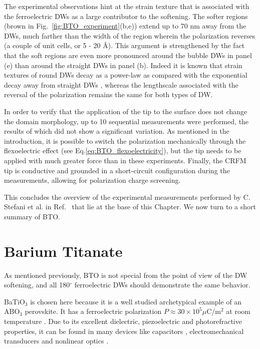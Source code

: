 The experimental observations hint at the strain texture that is associated with the ferroelectric DWs as a large contributor to the softening.
The softer regions (brown in Fig.~\ref{fig:BTO_experiment}(b,e)) extend up to 70 nm away from the DWs, much farther than the width of the region wherein the polarization reverses (a couple of unit cells, or 5 - 20 \AA \cite{Zhirnov1959}).
This argument is strengthened by the fact that the soft regions are even more pronounced around the bubble DWs in panel (e) than around the straight DWs in panel (b).
Indeed it is known that strain textures of round DWs decay as a power-law as compared with the exponential decay away from straight DWs \cite{Landau1960}, whereas the lengthscale associated with the reversal of the polarization remains the same for both types of DW.

In order to verify that the application of the tip to the surface does not change the domain morphology, up to 10 sequential measurements were performed, the results of which did not show a significant variation.
As mentioned in the introduction, it is possible to switch the polarization mechanically through the flexoelectric effect (see Eq.\ref{eq:BTO_flexoelectricity}), but the tip needs to be applied with much greater force than in these experiments.
Finally, the CRFM tip is conductive and grounded in a short-circuit configuration during the measurements, allowing for polarization charge screening.

This concludes the overview of the experimental measurements performed by C. Stefani et al. in Ref.~\cite{Stefani2020} that lie at the base of this Chapter.
We now turn to a short summary of BTO.

\section{Barium Titanate}
As mentioned previously, BTO is not special from the point of view of the DW softening, and all 180$^\circ$ ferroelectric DWs should demonstrate the same behavior.

BaTiO$_3$ is chosen here because it is a well studied archetypical example of an ABO$_3$ perovskite.
It has a ferroelectric polarization $P \approx 30 \times 10^5 \mu $C/m$^2$ at room temperature \cite{Mason1948, VonHippel1950, Ghosez1994}.
Due to its excellent dielectric, piezoelectric and photorefractive properties, it can be found in many devices like capacitors \cite{American1963}, electromechanical transducers \cite{Schofield1957} and nonlinear optics \cite{Ramakanth2015}.


